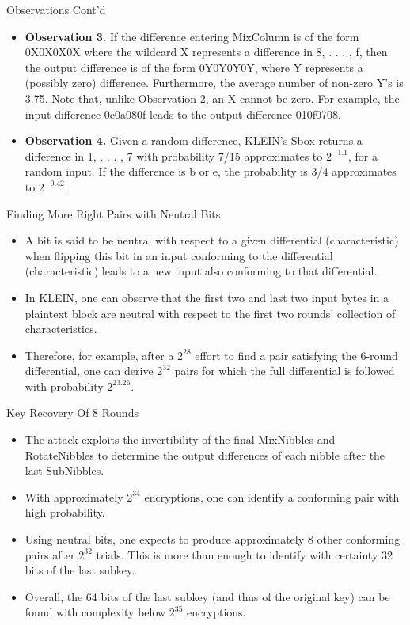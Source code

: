 \begin{frame}{Observations Cont'd}
	\begin{itemize}
		\item \textbf{Observation 3.} If the difference entering MixColumn is of the form 0X0X0X0X where the wildcard X represents a difference in {8, . . . , f}, then the output difference is of the form 0Y0Y0Y0Y, where Y represents a (possibly zero) difference. Furthermore, the average number of non-zero Y’s is 3.75. Note that, unlike Observation 2, an X cannot be zero. For example, the input difference 0c0a080f leads to the output difference 010f0708.\\
\item \textbf{Observation 4.} Given a random difference, KLEIN’s Sbox
returns a difference in {1, . . . , 7} with probability 7/15 approximates to $2^{−1.1}$, for a random input. If the difference is b or e, the probability is 3/4 approximates to $2^{−0.42}$.\\
	\end{itemize}
\end{frame}

\begin{frame}{Finding More Right Pairs with Neutral Bits}
	\begin{itemize}
		\item A bit is said to be neutral with respect to a given differential
(characteristic) when flipping this bit in an input conforming to the differential (characteristic) leads to a new input also conforming to that differential. 
\item In KLEIN, one can observe that the first two and last two input bytes in a plaintext block are neutral with respect to the first two rounds’ collection of characteristics. 
\item Therefore, for example, after a $2^{28}$ effort to find a pair
satisfying the 6-round differential, one can derive $2^{32}$ pairs for which the full differential is followed with probability $2^{23.26}$.\\
	\end{itemize}
\end{frame}

\begin{frame}{Key Recovery Of 8 Rounds}
	\begin{itemize}
		\item The attack exploits the invertibility of the final MixNibbles and RotateNibbles to determine the output differences of each nibble after the last SubNibbles.
        \item  With approximately $2^{34}$ encryptions, one can identify a conforming pair with high probability.
        \item Using neutral bits, one expects to produce approximately 8 other conforming pairs after $2^32$ trials. This is more than enough to identify with certainty 32 bits of the last subkey.
        \item Overall, the 64 bits of the last subkey (and thus of the original key) can be found with complexity below $2^{35}$ encryptions.
	\end{itemize}
\end{frame}

